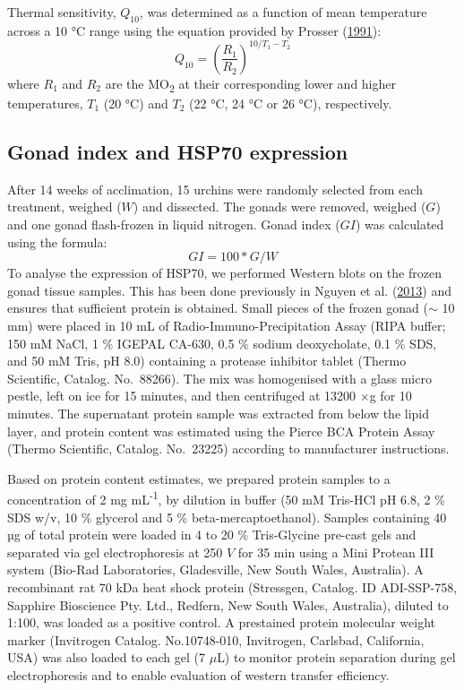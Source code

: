 \documentclass[a4paper,10pt, oneside]{memoir}
\begin{document}
Thermal sensitivity, \(Q_{10}\), was determined as a function of mean temperature across a 10 °C range using the equation provided by Prosser (\protect\hyperlink{ref-Prosser1991}{1991}): \[Q_{10} =\left( \frac{R_1}{R_2} \right)^{10/T_1-T_2}\] where \(R_1\) and \(R_2\) are the MO\textsubscript{2} at their corresponding lower and higher temperatures, \(T_1\) (20 °C) and \(T_2\) (22 °C, 24 °C or 26 °C), respectively.

\hypertarget{gonad-index-and-hsp70-expression}{%
\subsection{Gonad index and HSP70 expression}\label{gonad-index-and-hsp70-expression}}

After 14 weeks of acclimation, 15 urchins were randomly selected from each treatment, weighed (\(W\)) and dissected.
The gonads were removed, weighed (\(G\)) and one gonad flash-frozen in liquid nitrogen. Gonad index (\(GI\)) was calculated using the formula: \[GI =100 * G / W\]
To analyse the expression of HSP70, we performed Western blots on the frozen gonad tissue samples.
This has been done previously in Nguyen et al. (\protect\hyperlink{ref-Nguyen2013}{2013}) and ensures that sufficient protein is obtained.
Small pieces of the frozen gonad (\(\sim\) 10 mm) were placed in 10 mL of Radio-Immuno-Precipitation Assay (RIPA buffer; 150 mM NaCl, 1 \% IGEPAL CA-630, 0.5 \% sodium deoxycholate, 0.1 \% SDS, and 50 mM Tris, pH 8.0) containing a protease inhibitor tablet (Thermo Scientific, Catalog. No.~88266).
The mix was homogenised with a glass micro pestle, left on ice for 15 minutes, and then centrifuged at 13200 \(\times\)g for 10 minutes.
The supernatant protein sample was extracted from below the lipid layer, and protein content was estimated using the Pierce BCA Protein Assay (Thermo Scientific, Catalog. No.~23225) according to manufacturer instructions.

Based on protein content estimates, we prepared protein samples to a concentration of 2 mg mL\textsuperscript{-1}, by dilution in buffer (50 mM Tris-HCl pH 6.8, 2 \% SDS w/v, 10 \% glycerol and 5 \% beta-mercaptoethanol).
Samples containing 40 µg of total protein were loaded in 4 to 20 \% Tris-Glycine pre-cast gels and separated via gel electrophoresis at 250 \(V\) for 35 min using a Mini Protean III system (Bio-Rad Laboratories, Gladesville, New South Wales, Australia).
A recombinant rat 70 kDa heat shock protein (Stressgen, Catalog. ID ADI-SSP-758, Sapphire Bioscience Pty. Ltd., Redfern, New South Wales, Australia), diluted to 1:100, was loaded as a positive control.
A prestained protein molecular weight marker (Invitrogen Catalog. No.10748-010, Invitrogen, Carlsbad, California, USA) was also loaded to each gel (7 \(\mu\)L) to monitor protein separation during gel electrophoresis and to enable evaluation of western transfer efficiency.
\end{document}
